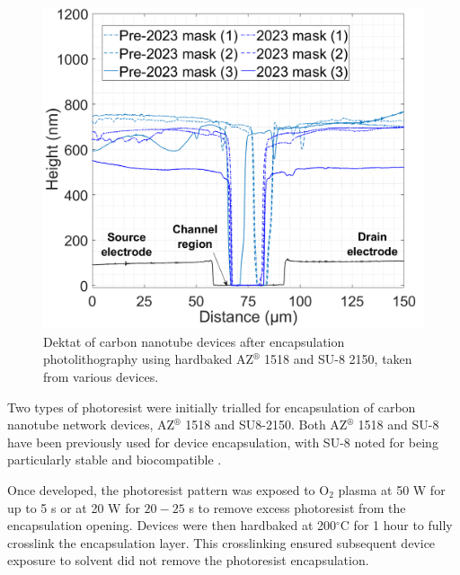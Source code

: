 \documentclass[
  a4paper,
]{scrbook}
\begin{document}
\begin{figure}
\begin{minipage}[t]{0.47\linewidth}
{{\includegraphics{./figures/ch4/dektat_SU8_profile_comparison.png}

}

}

\end{minipage}%

\caption{\label{fig-dektat-encapsulation}Dektat of carbon nanotube
devices after encapsulation photolithography using hardbaked
AZ\(^\circledR\) 1518 and SU-8 2150, taken from various devices.}

\end{figure}

Two types of photoresist were initially trialled for encapsulation of
carbon nanotube network devices, AZ\(^\circledR\) 1518 and SU8-2150.
Both AZ\(^\circledR\) 1518
\autocite{Thanihaichelvan2018,Thanihaichelvan2019,Shkodra2021} and SU-8
have been previously used for device encapsulation, with SU-8 noted for
being particularly stable and biocompatible
\autocite{Lee2006,Chen2021,Albarghouthi2022}.

Once developed, the photoresist pattern was exposed to O\(_2\) plasma at
50 W for up to 5 s or at 20 W for \(20-25\) s to remove excess
photoresist from the encapsulation opening. Devices were then hardbaked
at 200\(^\circ\)C for 1 hour to fully crosslink the encapsulation layer.
This crosslinking ensured subsequent device exposure to solvent did not
remove the photoresist encapsulation.
\end{document}
